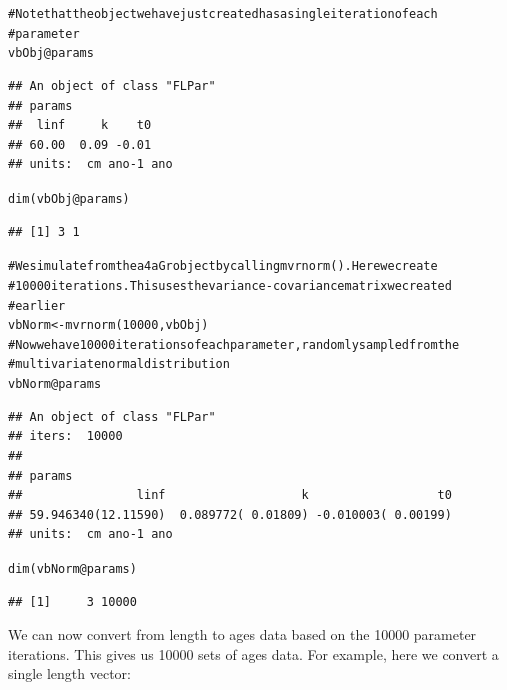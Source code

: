 \documentclass[a4paper,english,10pt]{article}\usepackage[]{graphicx}\usepackage[]{color}
\makeatletter
\newcommand{\hlnum}[1]{\textcolor[rgb]{0.2,0.2,0.2}{#1}}%
\newcommand{\hlcom}[1]{\textcolor[rgb]{0.2,0.267,0.4}{#1}}%
\newcommand{\hlopt}[1]{\textcolor[rgb]{0.2,0.2,0.2}{#1}}%
\newcommand{\hlstd}[1]{\textcolor[rgb]{0,0,0}{#1}}%
\newcommand{\hlkwb}[1]{\textcolor[rgb]{0.361,0.506,0.596}{#1}}%
\newcommand{\hlkwc}[1]{\textcolor[rgb]{0.361,0.506,0.596}{#1}}%
\newcommand{\hlkwd}[1]{\textcolor[rgb]{0.361,0.506,0.596}{#1}}%
\newenvironment{kframe}{%
 \def\at@end@of@kframe{}%
 \ifinner\ifhmode%
  \def\at@end@of@kframe{\end{minipage}}%
  \begin{minipage}{\columnwidth}%
 \fi\fi%
 \def\FrameCommand##1{\hskip\@totalleftmargin \hskip-\fboxsep
 \colorbox{shadecolor}{##1}\hskip-\fboxsep
     \hskip-\linewidth \hskip-\@totalleftmargin \hskip\columnwidth}%
 \MakeFramed {\advance\hsize-\width
   \@totalleftmargin\z@ \linewidth\hsize
   \@setminipage}}%
 {\par\unskip\endMakeFramed%
 \at@end@of@kframe}
\newenvironment{knitrout}{}{} %
\makeatother
\begin{document}
\begin{knitrout}
\color{fgcolor}\begin{kframe}
\begin{alltt}
\hlcom{# Note that the object we have just created has a single iteration of each}
\hlcom{# parameter}
\hlstd{vbObj}\hlopt{@}\hlkwc{params}
\end{alltt}
\begin{verbatim}
## An object of class "FLPar"
## params
##  linf     k    t0 
## 60.00  0.09 -0.01 
## units:  cm ano-1 ano
\end{verbatim}
\begin{alltt}
\hlkwd{dim}\hlstd{(vbObj}\hlopt{@}\hlkwc{params}\hlstd{)}
\end{alltt}
\begin{verbatim}
## [1] 3 1
\end{verbatim}
\begin{alltt}
\hlcom{# We simulate from the a4aGr object by calling mvrnorm().  Here we create}
\hlcom{# 10000 iterations.  This uses the variance-covariance matrix we created}
\hlcom{# earlier}
\hlstd{vbNorm} \hlkwb{<-} \hlkwd{mvrnorm}\hlstd{(}\hlnum{10000}\hlstd{, vbObj)}
\hlcom{# Now we have 10000 iterations of each parameter, randomly sampled from the}
\hlcom{# multivariate normal distribution}
\hlstd{vbNorm}\hlopt{@}\hlkwc{params}
\end{alltt}
\begin{verbatim}
## An object of class "FLPar"
## iters:  10000 
## 
## params
##                linf                   k                  t0 
## 59.946340(12.11590)  0.089772( 0.01809) -0.010003( 0.00199) 
## units:  cm ano-1 ano
\end{verbatim}
\begin{alltt}
\hlkwd{dim}\hlstd{(vbNorm}\hlopt{@}\hlkwc{params}\hlstd{)}
\end{alltt}
\begin{verbatim}
## [1]     3 10000
\end{verbatim}
\end{kframe}
\end{knitrout}


We can now convert from length to ages data based on the 10000 parameter iterations. This gives us 10000 sets of ages data. For example, here we convert a single length vector: 
\end{document}
